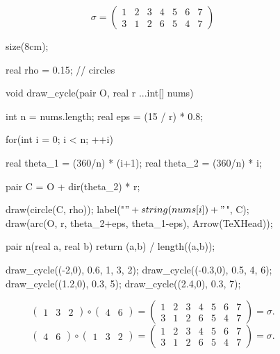 \begin{exm}
	\[
		\sigma = \begin{pmatrix}
			1&2&3&4&5&6&7\\
			3&1&2&6&5&4&7
		\end{pmatrix}
	\]

	\begin{figure}[H]
		\centering

		\begin{asy}
			size(8cm);

			real rho = 0.15; // circles

			void draw_cycle(pair O, real r ...int[] nums) {
				int n = nums.length;
				real eps = (15 / r) * 0.8;

				for(int i = 0; i < n; ++i) {
					real theta_1 = (360/n) * (i+1);
					real theta_2 = (360/n) * i;

					pair C = O + dir(theta_2) * r;

					draw(circle(C, rho));
					label("$" + string(nums[i]) + "$", C);
					draw(arc(O, r, theta_2+eps, theta_1-eps), Arrow(TeXHead));
				}
			}

			pair n(real a, real b) { return (a,b) / length((a,b)); }

			draw_cycle((-2,0), 0.6, 1, 3, 2);
			draw_cycle((-0.3,0), 0.5, 4, 6);
			draw_cycle((1.2,0), 0.3, 5);
			draw_cycle((2.4,0), 0.3, 7);
		\end{asy}
	\end{figure}

	\[
		\begin{pmatrix}
			1&3&2
		\end{pmatrix} \circ \begin{pmatrix}
			4&6
		\end{pmatrix} = \begin{pmatrix}
			1&2&3&4&5&6&7\\
			3&1&2&6&5&4&7
		\end{pmatrix} = \sigma.
	\]
	\[
		\begin{pmatrix}
			4&6
		\end{pmatrix} \circ \begin{pmatrix}
			1&3&2
		\end{pmatrix} = \begin{pmatrix}
			1&2&3&4&5&6&7\\
			3&1&2&6&5&4&7
		\end{pmatrix} = \sigma.
	\]
\end{exm}

